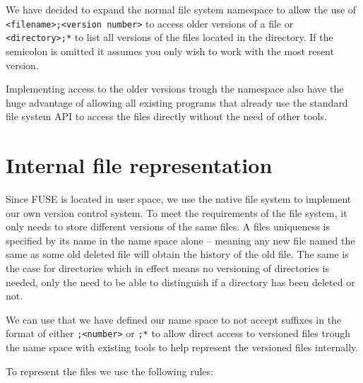 \documentclass[12pt]{article}
\begin{document}
We have decided to expand the normal file system namespace to allow
the use of \texttt{<filename>;<version number>} to access older versions
of a file or \texttt{<directory>;*} to list all versions of the files
located in the directory. If the semicolon is omitted it assumes you
only wish to work with the most resent version.

Implementing access to the older versions trough the namespace also
have the huge advantage of allowing all existing programs that already
use the standard file system API to access the files directly without
the need of other tools.

\section{Internal file representation}
Since FUSE is located in user space, we use the native file system to
implement our own version control system. To meet the requirements of
the file system, it only needs to store different versions of the same
files. A files uniqueness is specified by its name in the name space
alone – meaning any new file named the same as some old deleted file
will obtain the history of the old file. The same is the case for
directories which in effect means no versioning of directories is
needed, only the need to be able to distinguish if a directory has
been deleted or not.

We can use that we have defined our name space to not accept suffixes
in the format of either \texttt{;<number>} or \texttt{;*} to allow direct access to
versioned files trough the name space with existing tools to help
represent the versioned files internally.

To represent the files we use the following rules:
\end{document}

